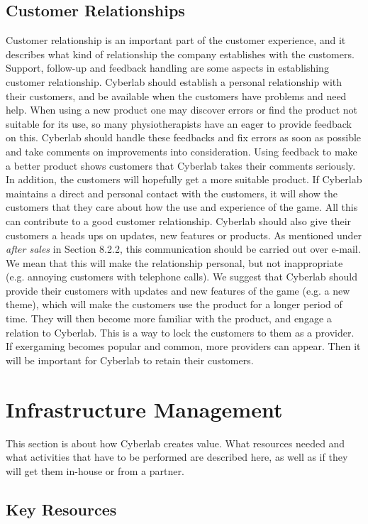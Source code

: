 \subsection{Customer Relationships}
Customer relationship is an important part of the customer experience, and it describes what kind of relationship the company establishes with the customers. Support, follow-up and feedback handling are some aspects in establishing customer relationship. Cyberlab should establish a personal relationship with their customers, and be available when the customers have problems and need help. When using a new product one may discover errors or find the product not suitable for its use, so many physiotherapists have an eager to provide feedback on this. Cyberlab should handle these feedbacks and fix errors as soon as possible and take comments on improvements into consideration. Using feedback to make a better product shows customers that Cyberlab takes their comments seriously.  In addition, the customers will hopefully get a more suitable product.  If Cyberlab maintains a direct and personal contact with the customers, it will show the customers that they care about how the use and experience of the game.  All this can contribute to a good customer relationship. Cyberlab should also give their customers a heads ups on updates, new features or products. As mentioned under \emph{after sales} in Section 8.2.2, this communication should be carried out over e-mail. We mean that this will make the relationship personal, but not inappropriate (e.g. annoying customers with telephone calls). We suggest that Cyberlab should provide their customers with updates and new features of the game (e.g. a new theme), which will make the customers use the product for a longer period of time. They will then become more familiar with the product, and engage a relation to Cyberlab. This is a way to lock the customers to them as a provider. If exergaming becomes popular and common, more providers can appear. Then it will be important for Cyberlab to retain their customers. 

\section{Infrastructure Management}
This section is about how Cyberlab creates value. What resources needed and what activities that have to be performed are described here, as well as if they will get them in-house or from a partner. 

\subsection{Key Resources}

